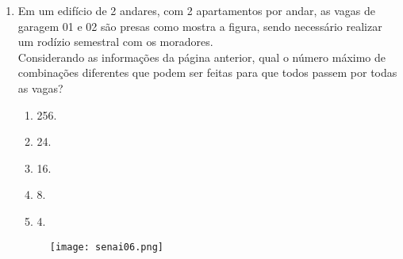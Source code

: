 \documentclass[a4paper,14pt]{article}
\begin{document}
\begin{enumerate}
        \item Em um edifício de 2 andares, com 2 apartamentos por andar, as vagas de garagem 01 e 02 são presas
        como mostra a figura, sendo necessário realizar um rodízio semestral com os moradores. \\
    
	    Considerando as informações da página anterior, qual o número máximo de combinações diferentes que podem ser feitas para que todos passem por todas as vagas? \\
	    \begin{enumerate}
        	\item 256.
        	\item 24.
        	\item 16.
        	\item 8.
        	\item 4.
        \end{enumerate}
    
	    \begin{figure}[h] %
	    	\centering
	    	\texttt{[image: senai06.png]} %
	    \end{figure}


\end{enumerate}
\end{document}
